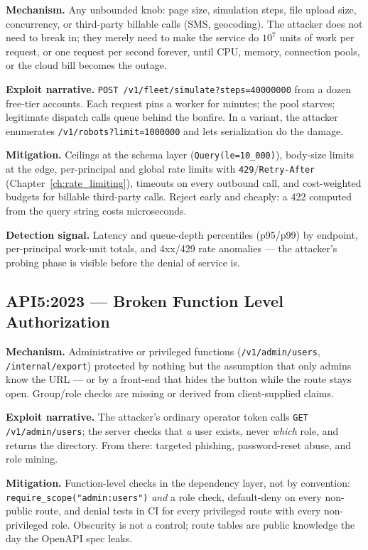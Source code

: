 \textbf{Mechanism.} Any unbounded knob: page size, simulation steps, file
upload size, concurrency, or third-party billable calls (SMS, geocoding).
The attacker does not need to break in; they merely need to make the service
do $10^7$ units of work per request, or one request per second forever,
until CPU, memory, connection pools, or the cloud bill becomes the outage.

\textbf{Exploit narrative.} \texttt{POST /v1/fleet/simulate?steps=40000000}
from a dozen free-tier accounts. Each request pins a worker for minutes;
the pool starves; legitimate dispatch calls queue behind the bonfire. In a
variant, the attacker enumerates \texttt{/v1/robots?limit=1000000} and lets
serialization do the damage.

\textbf{Mitigation.} Ceilings at the schema layer
(\texttt{Query(le=10\_000)}), body-size limits at the edge, per-principal
and global rate limits with \texttt{429}/\texttt{Retry-After}
(Chapter~\ref{ch:rate_limiting}), timeouts on every outbound call, and
cost-weighted budgets for billable third-party calls. Reject early and
cheaply: a 422 computed from the query string costs microseconds.

\textbf{Detection signal.} Latency and queue-depth percentiles (p95/p99) by
endpoint, per-principal work-unit totals, and 4xx/429 rate anomalies ---
the attacker's probing phase is visible before the denial of service is.

\subsection{API5:2023 --- Broken Function Level Authorization}
\label{sec:ch16-api5}

\textbf{Mechanism.} Administrative or privileged functions
(\texttt{/v1/admin/users}, \texttt{/internal/export}) protected by nothing
but the assumption that only admins know the URL --- or by a front-end that
hides the button while the route stays open. Group/role checks are missing
or derived from client-supplied claims.

\textbf{Exploit narrative.} The attacker's ordinary operator token calls
\texttt{GET /v1/admin/users}; the server checks that \emph{a} user exists,
never \emph{which} role, and returns the directory. From there: targeted
phishing, password-reset abuse, and role mining.

\textbf{Mitigation.} Function-level checks in the dependency layer, not by
convention: \texttt{require\_scope("admin:users")} \emph{and} a role check,
default-deny on every non-public route, and denial tests in CI for every
privileged route with every non-privileged role. Obscurity is not a
control; route tables are public knowledge the day the OpenAPI spec leaks.

